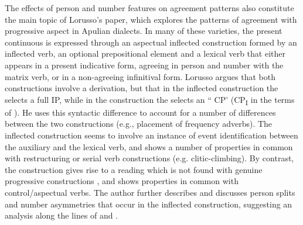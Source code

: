 \documentclass[output=paper]{langsci/langscibook}
\begin{document}
The effects of person and number features on agreement patterns also constitute the main topic of Lorusso’s paper, which explores the patterns of agreement with progressive aspect in Apulian dialects. In many of these varieties, the present continuous is expressed through an aspectual inflected construction formed by an inflected  verb, an optional prepositional element and a lexical verb that either appears in a present indicative form, agreeing in person and number with the matrix verb, or in a non-agreeing infinitival form. Lorusso argues that both constructions involve a  derivation, but that in the inflected construction the  selects a full IP, while in the  construction the  selects an `` CP' (CP\textsubscript{I} in the terms of \citealt{Manzini2003}). He uses this syntactic difference to account for a number of differences between the two constructions (e.g., placement of frequency adverbs). The inflected construction seems to involve an instance of event identification \citep{Kratzer1996} between the auxiliary and the lexical verb, and shows a number of properties in common with restructuring or serial verb constructions (e.g. clitic-climbing). By contrast, the  construction gives rise to a  reading which is not found with genuine progressive constructions \citep{Chierchia1995}, and shows properties in common with control\slash aspectual verbs. The author further describes and discusses person splits and number asymmetries that occur in the inflected construction, suggesting an analysis along the lines of \citet{Bobaljik2008Phi} and \citet{Manzini2007,Manzini2011Grammatical}.
\end{document}

